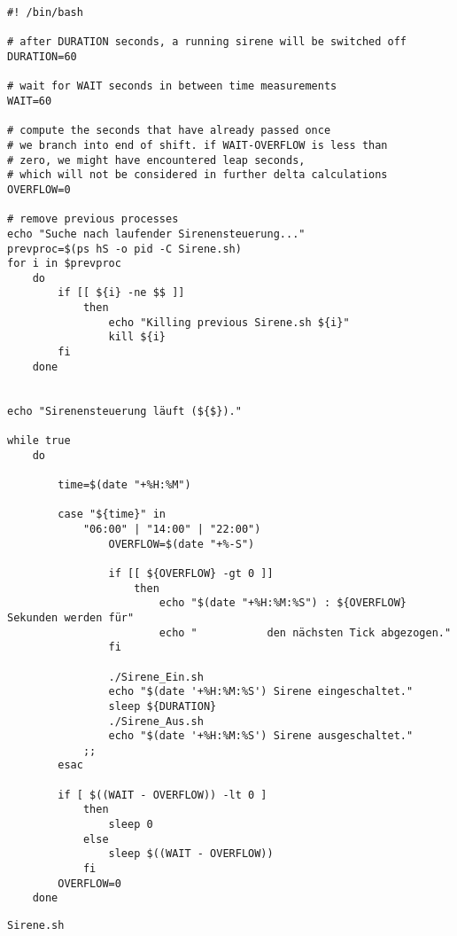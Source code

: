 \begin{listing}[H]
    \begin{verbatim}
#! /bin/bash

# after DURATION seconds, a running sirene will be switched off
DURATION=60

# wait for WAIT seconds in between time measurements
WAIT=60

# compute the seconds that have already passed once
# we branch into end of shift. if WAIT-OVERFLOW is less than
# zero, we might have encountered leap seconds,
# which will not be considered in further delta calculations
OVERFLOW=0

# remove previous processes
echo "Suche nach laufender Sirenensteuerung..."
prevproc=$(ps hS -o pid -C Sirene.sh)
for i in $prevproc
    do
        if [[ ${i} -ne $$ ]]
            then
                echo "Killing previous Sirene.sh ${i}"
                kill ${i}
        fi
    done


echo "Sirenensteuerung läuft (${$})."

while true
    do

        time=$(date "+%H:%M")

        case "${time}" in
            "06:00" | "14:00" | "22:00")
                OVERFLOW=$(date "+%-S")

                if [[ ${OVERFLOW} -gt 0 ]]
                    then
                        echo "$(date "+%H:%M:%S") : ${OVERFLOW} Sekunden werden für"
                        echo "           den nächsten Tick abgezogen."
                fi

                ./Sirene_Ein.sh
                echo "$(date '+%H:%M:%S') Sirene eingeschaltet."
                sleep ${DURATION}
                ./Sirene_Aus.sh
                echo "$(date '+%H:%M:%S') Sirene ausgeschaltet."
            ;;
        esac

        if [ $((WAIT - OVERFLOW)) -lt 0 ]
            then
                sleep 0
            else
                sleep $((WAIT - OVERFLOW))
            fi
        OVERFLOW=0
    done
    \end{verbatim}
    \caption{\texttt{Sirene.sh}}
    \label{lst:sirene}
\end{listing}

